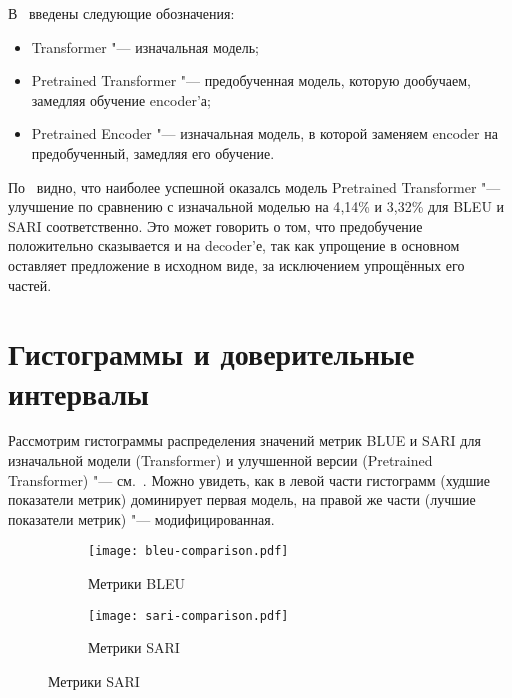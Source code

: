 В~ введены следующие обозначения:
\begin{itemize}%
  \item Transformer "--- изначальная модель;
  \item Pretrained Transformer "--- предобученная модель, которую дообучаем, замедляя обучение encoder'а;
  \item Pretrained Encoder "--- изначальная модель, в которой заменяем encoder на предобученный, замедляя его обучение.
\end{itemize}

По~ видно, что наиболее успешной оказалсь модель Pretrained Transformer "--- улучшение по сравнению с изначальной моделью на 4{,}14\% и 3{,}32\% для BLEU и SARI соответственно.
Это может говорить о том, что предобучение положительно сказывается и на decoder'е, так как упрощение в основном оставляет предложение в исходном виде, за исключением упрощённых его частей.


\section{Гистограммы и доверительные интервалы}


Рассмотрим гистограммы распределения значений метрик BLUE и SARI для изначальной модели (Transformer) и улучшенной версии (Pretrained Transformer) "--- см.~.
Можно увидеть, как в левой части гистограмм (худшие показатели метрик) доминирует первая модель, на правой же части (лучшие показатели метрик) "--- модифицированная.

\begin{figure}[H]%
  \centering%
  \caption{Сравнение гистограмм метрик BLEU~(a) и SARI~(b) \\ жёлтый "--- Transformer, синий "--- Pretrained Transformer}
  \label{metrics-comparison}
  \begin{subfigure}[H]{0.45\textwidth}
    \label{bleu-part}
    \texttt{[image: bleu-comparison.pdf]}
    \caption{Метрики BLEU}
  \end{subfigure}
  \begin{subfigure}[H]{0.45\textwidth}
    \label{sari-part}
    \texttt{[image: sari-comparison.pdf]}
    \caption{Метрики SARI}
  \end{subfigure}
\end{figure}%

